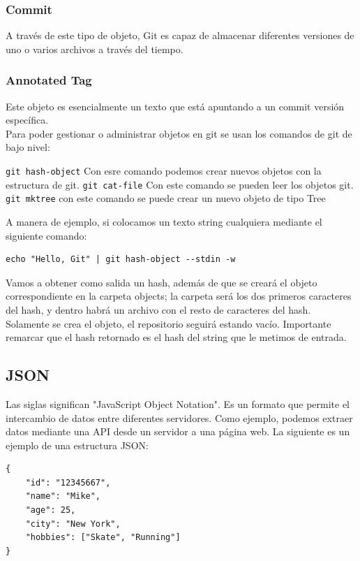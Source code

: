 \subsubsection{Commit}
A través de este tipo de objeto, Git es capaz de almacenar diferentes versiones de uno o varios archivos a través del tiempo.
\subsubsection{Annotated Tag}
Este objeto es esencialmente un texto que está apuntando a un commit versión específica. \\

Para poder gestionar o administrar objetos en git se usan los comandos de git de bajo nivel:

\texttt{git hash-object} Con esre comando podemos crear nuevos objetos con la estructura de git.
\texttt{git cat-file} Con este comando se pueden leer los objetos git.
\texttt{git mktree} con este comando se puede crear un nuevo objeto de tipo Tree 

A manera de ejemplo, si colocamos un texto string cualquiera mediante el siguiente comando:

\begin{verbatim}
echo "Hello, Git" | git hash-object --stdin -w
\end{verbatim}

Vamos a obtener como salida un hash, además de que se creará el objeto correspondiente en la carpeta objects; la carpeta será los dos primeros caracteres del hash, y dentro habrá un archivo con el resto de caracteres del hash. Solamente se crea el objeto, el repositorio seguirá estando vacío. Importante remarcar que el hash retornado es el hash del string que le metimos de entrada.

\subsection{JSON}

Las siglas significan "JavaScript Object Notation". Es un formato que permite el intercambio de datos entre diferentes servidores. Como ejemplo, podemos extraer datos mediante una API desde un servidor a una página web. La siguiente es un ejemplo de una estructura JSON:

\begin{verbatim}
{
    "id": "12345667",
    "name": "Mike",
    "age": 25,
    "city": "New York",
    "hobbies": ["Skate", "Running"]
}
\end{verbatim}

